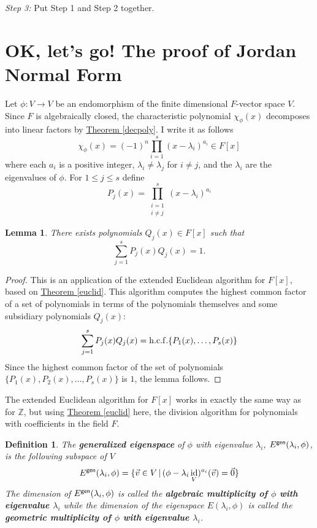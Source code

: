 \documentclass[11pt]{amsbook}
\DeclareMathOperator{\id}{\mathrm{id}}
\newtheorem{definition}[theorem]{Definition}
\newtheorem{lemma}[theorem]{Lemma}
\theoremstyle{definition}
\begin{document}
{\it Step 3:} Put Step 1 and Step 2 together.
\medskip


\section{OK, let's go! The proof of Jordan Normal Form}
 Let $\phi : V\to V$ be an endomorphism of the finite dimensional $F$-vector space $V$. Since $F$ is algebraically closed, the characteristic polynomial $\chi_\phi(x)$ decomposes into linear factors by \hyperref[decpoly]{Theorem \ref{decpoly}}. I write it as follows $$\chi_\phi(x) = (-1)^n \prod_{i=1}^s (x- \lambda_i)^{a_i} \in F[x]$$ where each $a_i$ is a positive integer, $\lambda_i \neq \lambda_j$ for $i\neq j$, and the $\lambda_i$ are the eigenvalues of $\phi$. For $1\leqslant j\leqslant s$ define $$P_j(x) = \prod_{\substack{i=1 \\ i\neq j}}^s (x-\lambda_i)^{a_i}$$

\begin{lemma} \label{hcf} There exists polynomials $Q_j(x)\in F[x]$ such that $$\sum_{j=1}^s P_j(x)Q_j(x) = 1.$$
\end{lemma}

\begin{proof} This is an application of the extended Euclidean algorithm for $F[x]$, based on \hyperref[euclid]{Theorem \ref{euclid}}. This algorithm computes the highest common factor of a set of polynomials in terms of the polynomials themselves and some subsidiary polynomials $Q_j(x)$: $$\sum_{j=1}^s P_j(x)Q_j(x) = {\rm h.c.f.}\{P_1(x), \ldots , P_s(x)\}$$ Since the highest common factor of the set of polynomials $\{ P_1(x), P_2(x), \ldots , P_s(x) \}$ is $1$, the lemma follows.
\end{proof}

The extended Euclidean algorithm for $F[x]$ works in exactly the same way as for $\mathbb{Z}$, but using
 \hyperref[euclid]{Theorem \ref{euclid}} here, the division algorithm for polynomials with coefficients in the field $F$.

\begin{definition} The {\bf generalized eigenspace} of $\phi$ with eigenvalue $\lambda_i$, $E^{\sf gen}(\lambda_i, \phi)$, is the following subspace of $V$ $$E^{\sf gen}(\lambda_i, \phi) = \{ \vec{v}\in V\, \vert\, (\phi-\lambda_i\id_V)^{a_i} (\vec{v}) = \vec{0} \}$$ The dimension of $E^{\sf gen}(\lambda_i, \phi)$ is called the {\bf algebraic multiplicity of $\phi$ with eigenvalue $\lambda_i$} while the dimension of the eigenspace $E(\lambda_i, \phi)$ is called the {\bf geometric multiplicity of $\phi$ with eigenvalue $\lambda_i$}.
\end{definition}
\end{document}
